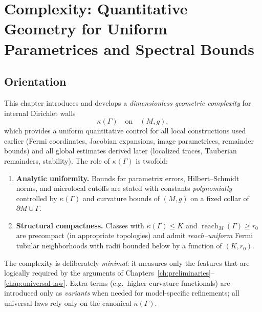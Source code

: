
\providecommand{\vol}{\operatorname{vol}}
\providecommand{\Dom}{\operatorname{Dom}}
\providecommand{\Spec}{\operatorname{Spec}}
\providecommand{\Tr}{\operatorname{Tr}}
\providecommand{\dist}{\operatorname{dist}}
\providecommand{\reach}{\operatorname{reach}}
\providecommand{\inj}{\operatorname{inj}}
\providecommand{\Ric}{\operatorname{Ric}}
\providecommand{\II}{\mathrm{II}}

\chapter{Complexity: Quantitative Geometry for Uniform Parametrices and Spectral Bounds}
\label{chap:complexity}

\section*{Orientation}
This chapter introduces and develops a \emph{dimensionless geometric complexity} for internal Dirichlet walls
\[
\kappa(\Gamma)\quad\text{on}\quad (M,g),
\]
which provides a uniform quantitative control for all local constructions used earlier (Fermi coordinates, Jacobian expansions, image parametrices, remainder bounds) and all global estimates derived later (localized traces, Tauberian remainders, stability). The role of $\kappa(\Gamma)$ is twofold:

\begin{enumerate}
  \item \textbf{Analytic uniformity.} Bounds for parametrix errors, Hilbert--Schmidt norms, and microlocal cutoffs are stated with constants \emph{polynomially} controlled by $\kappa(\Gamma)$ and curvature bounds of $(M,g)$ on a fixed collar of $\partial M\cup\Gamma$.
  \item \textbf{Structural compactness.} Classes with $\kappa(\Gamma)\le K$ and $\reach_M(\Gamma)\ge r_0$ are precompact (in appropriate topologies) and admit \emph{reach--uniform} Fermi tubular neighborhoods with radii bounded below by a function of $(K,r_0)$.
\end{enumerate}

The complexity is deliberately \emph{minimal}: it measures only the features that are logically required by the arguments of Chapters~\ref{ch:preliminaries}–\ref{chap:universal-law}. Extra terms (e.g.\ higher curvature functionals) are introduced only as \emph{variants} when needed for model-specific refinements; all universal laws rely only on the canonical $\kappa(\Gamma)$.

